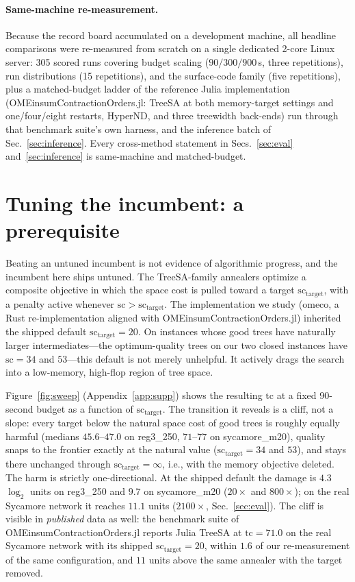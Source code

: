 \documentclass{SciPost}
\newcommand{\tc}{\ensuremath{\mathrm{tc}}}
\newcommand{\sct}{\ensuremath{\mathrm{sc}}}
\newcommand{\scT}{\ensuremath{\mathrm{sc}_{\mathrm{target}}}}
\begin{document}
\paragraph{Same-machine re-measurement.}
Because the record board accumulated on a development machine, all
headline comparisons were re-measured from scratch on a single dedicated
2-core Linux server: 305 scored runs covering budget scaling
($90/300/900$\,s, three repetitions), run distributions (15 repetitions),
and the surface-code family (five repetitions), plus a matched-budget
ladder of the reference Julia implementation
(OMEinsumContractionOrders.jl: TreeSA at both memory-target settings and
one/four/eight restarts, HyperND, and three treewidth back-ends) run
through that benchmark suite's own harness, and the inference batch of
Sec.~\ref{sec:inference}. Every cross-method statement in
Secs.~\ref{sec:eval} and~\ref{sec:inference} is same-machine and
matched-budget.

\section{Tuning the incumbent: a prerequisite}
\label{sec:sctarget}

Beating an untuned incumbent is not evidence of algorithmic progress, and
the incumbent here ships untuned. The TreeSA-family annealers
\cite{kalachev_2021_multi} optimize a composite objective in which the
space cost is pulled toward a target $\scT$, with a penalty active
whenever $\sct > \scT$. The implementation we study (omeco, a Rust
re-implementation aligned with OMEinsumContractionOrders.jl) inherited
the shipped default $\scT = 20$. On instances whose good trees have
naturally larger intermediates---the optimum-quality trees on our two
closed instances have $\sct = 34$ and $53$---this default is not merely
unhelpful. It actively drags the search into a low-memory, high-flop
region of tree space.

Figure~\ref{fig:sweep} (Appendix~\ref{app:supp}) shows the resulting
$\tc$ at a fixed 90-second budget as a function of $\scT$. The transition it reveals is a cliff,
not a slope: every target below the natural space cost of good trees is
roughly equally harmful (medians $45.6$--$47.0$ on reg3\_250, $71$--$77$
on sycamore\_m20), quality snaps to the frontier exactly at the natural
value ($\scT = 34$ and $53$), and stays there unchanged through
$\scT=\infty$, i.e., with the memory objective deleted. The harm is
strictly one-directional. At the shipped default the damage is $4.3$
$\log_2$ units on reg3\_250 and $9.7$ on sycamore\_m20 ($20\times$ and
$800\times$); on the real Sycamore network it reaches $11.1$ units
($2100\times$, Sec.~\ref{sec:eval}). The cliff is visible in
\emph{published} data as well: the benchmark suite of
OMEinsumContractionOrders.jl reports Julia TreeSA at $\tc=71.0$ on the
real Sycamore network with its shipped $\scT=20$, within $1.6$ of our
re-measurement of the same configuration, and $11$ units above the same
annealer with the target removed.
\end{document}
